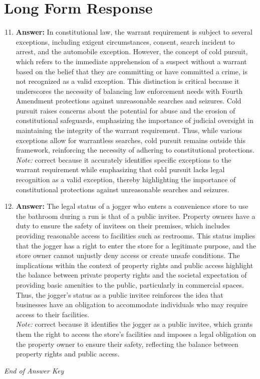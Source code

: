 \documentclass[12pt]{article}
\begin{document}
\section*{Long Form Response}
\begin{enumerate}[label=\arabic*.]
\setcounter{enumi}{10}
\item \textbf{Answer:} In constitutional law, the warrant requirement is subject to several exceptions, including exigent circumstances, consent, search incident to arrest, and the automobile exception. However, the concept of cold pursuit, which refers to the immediate apprehension of a suspect without a warrant based on the belief that they are committing or have committed a crime, is not recognized as a valid exception. This distinction is critical because it underscores the necessity of balancing law enforcement needs with Fourth Amendment protections against unreasonable searches and seizures. Cold pursuit raises concerns about the potential for abuse and the erosion of constitutional safeguards, emphasizing the importance of judicial oversight in maintaining the integrity of the warrant requirement. Thus, while various exceptions allow for warrantless searches, cold pursuit remains outside this framework, reinforcing the necessity of adhering to constitutional protections.
\\ \textit{Note:} correct because it accurately identifies specific exceptions to the warrant requirement while emphasizing that cold pursuit lacks legal recognition as a valid exception, thereby highlighting the importance of constitutional protections against unreasonable searches and seizures.
\item \textbf{Answer:} The legal status of a jogger who enters a convenience store to use the bathroom during a run is that of a public invitee. Property owners have a duty to ensure the safety of invitees on their premises, which includes providing reasonable access to facilities such as restrooms. This status implies that the jogger has a right to enter the store for a legitimate purpose, and the store owner cannot unjustly deny access or create unsafe conditions. The implications within the context of property rights and public access highlight the balance between private property rights and the societal expectation of providing basic amenities to the public, particularly in commercial spaces. Thus, the jogger's status as a public invitee reinforces the idea that businesses have an obligation to accommodate individuals who may require access to their facilities.
\\ \textit{Note:} correct because it identifies the jogger as a public invitee, which grants them the right to access the store's facilities and imposes a legal obligation on the property owner to ensure their safety, reflecting the balance between property rights and public access.
\end{enumerate}

\vfill
\noindent\textit{End of Answer Key}
\end{document}
